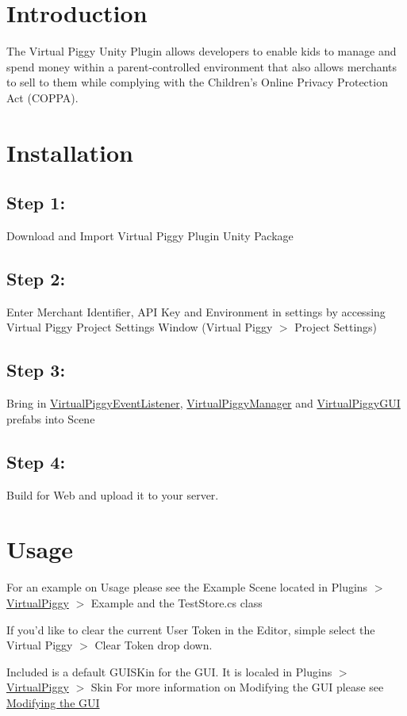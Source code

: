 \hypertarget{index_intro_sec}{}\section{Introduction}\label{index_intro_sec}
The Virtual Piggy Unity Plugin allows developers to enable kids to manage and spend money within a parent-\/controlled environment that also allows merchants to sell to them while complying with the Children's Online Privacy Protection Act (C\-O\-P\-P\-A).\hypertarget{index_install_sec}{}\section{Installation}\label{index_install_sec}
\hypertarget{index_step1}{}\subsection{Step 1\-:}\label{index_step1}
Download and Import Virtual Piggy Plugin Unity Package \hypertarget{index_step2}{}\subsection{Step 2\-:}\label{index_step2}
Enter Merchant Identifier, A\-P\-I Key and Environment in settings by accessing Virtual Piggy Project Settings Window (Virtual Piggy $>$ Project Settings) \hypertarget{index_step3}{}\subsection{Step 3\-:}\label{index_step3}
Bring in \hyperlink{class_virtual_piggy_event_listener}{Virtual\-Piggy\-Event\-Listener}, \hyperlink{class_virtual_piggy_manager}{Virtual\-Piggy\-Manager} and \hyperlink{class_virtual_piggy_g_u_i}{Virtual\-Piggy\-G\-U\-I} prefabs into Scene \hypertarget{index_step4}{}\subsection{Step 4\-:}\label{index_step4}
Build for Web and upload it to your server. \hypertarget{index_usage_sec}{}\section{Usage}\label{index_usage_sec}
For an example on Usage please see the Example Scene located in Plugins $>$ \hyperlink{class_virtual_piggy}{Virtual\-Piggy} $>$ Example and the Test\-Store.\-cs class

If you'd like to clear the current User Token in the Editor, simple select the Virtual Piggy $>$ Clear Token drop down.

Included is a default G\-U\-I\-S\-Kin for the G\-U\-I. It is localed in Plugins $>$ \hyperlink{class_virtual_piggy}{Virtual\-Piggy} $>$ Skin For more information on Modifying the G\-U\-I please see \hyperlink{modifying_the_gui}{Modifying the G\-U\-I} 